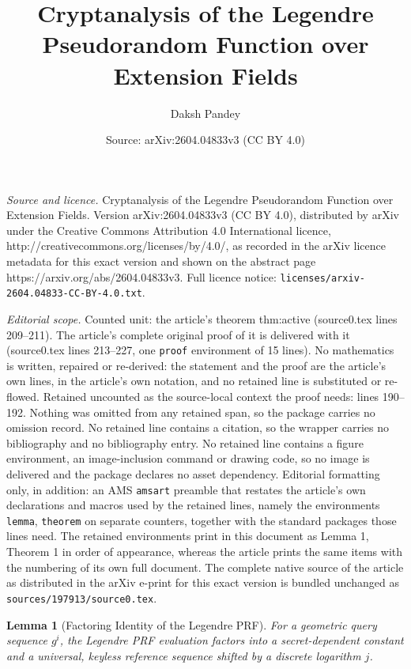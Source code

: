 \documentclass[10pt,a4paper]{amsart}
\title{Cryptanalysis of the Legendre Pseudorandom Function over Extension Fields}
\author{Daksh Pandey}
\date{Source: arXiv:2604.04833v3 (CC BY 4.0)}
\newtheorem{lemma}{Lemma}
\begin{document}
\maketitle

\noindent\emph{Source and licence.} Cryptanalysis of the Legendre Pseudorandom Function over Extension Fields. Version arXiv:2604.04833v3 (CC BY 4.0), distributed by arXiv under the Creative Commons Attribution 4.0 International licence, http://creativecommons.org/licenses/by/4.0/, as recorded in the arXiv licence metadata for this exact version and shown on the abstract page https://arxiv.org/abs/2604.04833v3. Full licence notice: \texttt{licenses/arxiv-2604.04833-CC-BY-4.0.txt}.\par\smallskip

\noindent\textit{Editorial scope.} Counted unit: the article's theorem thm:active (source0.tex lines 209--211). The article's complete original proof of it is delivered with it (source0.tex lines 213--227, one \texttt{proof} environment of 15 lines). No mathematics is written, repaired or re-derived: the statement and the proof are the article's own lines, in the article's own notation, and no retained line is substituted or re-flowed.  Retained uncounted as the source-local context the proof needs: lines 190--192.  Nothing was omitted from any retained span, so the package carries no omission record.  No retained line contains a citation, so the wrapper carries no bibliography and no bibliography entry.  No retained line contains a figure environment, an image-inclusion command or drawing code, so no image is delivered and the package declares no asset dependency.  Editorial formatting only, in addition: an AMS \texttt{amsart} preamble that restates the article's own declarations and macros used by the retained lines, namely the environments \texttt{lemma}, \texttt{theorem} on separate counters, together with the standard packages those lines need.  The retained environments print in this document as Lemma 1, Theorem 1 in order of appearance, whereas the article prints the same items with the numbering of its own full document.  The complete native source of the article as distributed in the arXiv e-print for this exact version is bundled unchanged as \texttt{sources/197913/source0.tex}.
\begin{lemma}[Factoring Identity of the Legendre PRF] \label{lemma:factor}
For a geometric query sequence $g^i$, the Legendre PRF evaluation factors into a secret-dependent constant and a universal, keyless reference sequence shifted by a discrete logarithm $j$.
\end{lemma}
\end{document}
